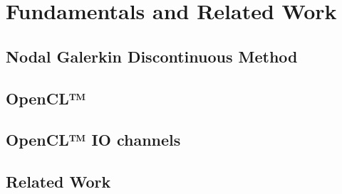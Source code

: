 \chapter{Fundamentals and Related Work}
\label{cha:Fundamentals}

\section{Nodal Galerkin Discontinuous Method}


\section{OpenCL™}

\section{OpenCL™ IO channels}

\section{Related Work}

